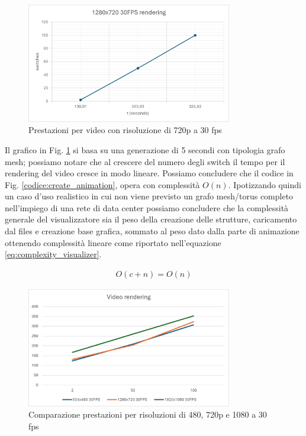 \documentclass[binding=0.6cm]{sapthesis}
\begin{document}
\begin{figure}[h]
    \centering
    \includegraphics[width=0.8\textwidth]{immagini/720p_rendering_performance.png}
    \caption{Prestazioni per video con risoluzione di 720p a 30 fps}
    \label{fig:720p_rendering_performance}
\end{figure}

Il grafico in Fig. \ref{fig:720p_rendering_performance} si basa su una generazione di 5 secondi con tipologia grafo mesh; possiamo notare che al
crescere del numero degli switch il tempo per il rendering del video cresce in modo lineare. Possiamo concludere che il codice in Fig. \ref{codice:create_animation}, opera con 
complessità \(O(n)\). Ipotizzando quindi un caso d'uso realistico in cui non viene previsto un grafo mesh/torus completo nell'impiego di una rete di data center
possiamo concludere che la complessità generale del visualizzatore sia il peso della creazione delle strutture, caricamento dal files e creazione base grafica, sommato 
al peso dato dalla parte di animazione ottenendo complessità lineare come riportato nell'equazione \ref{eq:complexity_visualizer}.

\begin{align}
    O(c + n) = O(n)
    \label{eq:complexity_visualizer}
\end{align}



\begin{figure}[h]
    \centering
    \includegraphics[width=0.8\textwidth]{immagini/480_720_1080_rend_perf.png}
    \caption{Comparazione prestazioni per risoluzioni di 480, 720p e 1080 a 30 fps}
    \label{fig:480_720_1080_rend_perf}
\end{figure}
\end{document}
